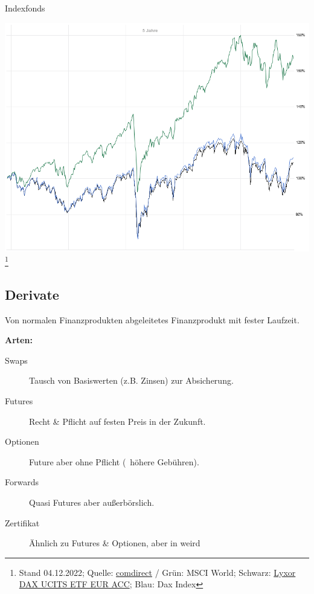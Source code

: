\documentclass{beamer}
\begin{document}
			\begin{frame}{Indexfonds}
				\begin{center}
					\includegraphics[height=0.75\textheight,trim=0 0 0 0.5cm]{images/dax-etf-benchmark}\footnote{Stand 04.12.2022; Quelle: \href{https://charts.comdirect.de/charts/benchmark_underlying.chart?HEIGHT=600&WIDTH=800&ID_BENCH1=20735&ID_BENCH2=12221463&ID_NOTATION=17138767&TIME_SPAN=5Y}{comdirect} / Grün: MSCI World; Schwarz: \href{https://www.comdirect.de/inf/etfs/LU0252633754}{Lyxor DAX UCITS ETF EUR ACC}; Blau: Dax Index}\\
				\end{center}
			\end{frame}
		
		\subsection{Derivate}
		
			\begin{frame}
				\begin{definition}
					Von normalen Finanzprodukten abgeleitetes Finanzprodukt mit fester Laufzeit.
				\end{definition}
				\textbf{Arten:}
				\begin{description}
					\item[Swaps] Tausch von Basiswerten (z.B. Zinsen) zur Absicherung.
					\item[Futures] Recht \& Pflicht auf festen Preis in der Zukunft.
					\item[Optionen] Future aber ohne Pflicht (\textrightarrow\ höhere Gebühren).
					\item[Forwards] Quasi Futures aber außerbörslich.
					\item[Zertifikat] Ähnlich zu Futures \& Optionen, aber in weird
				\end{description}
			\end{frame}
		
\end{document}

